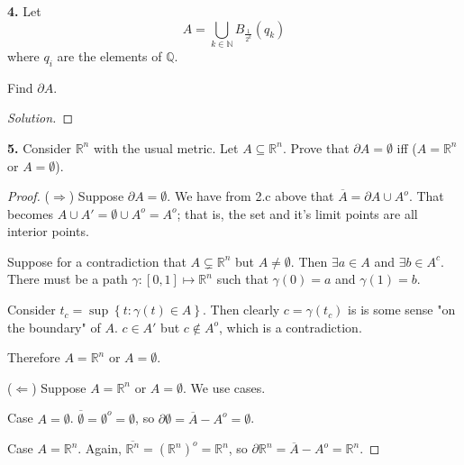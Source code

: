 \documentclass{article}
\newcommand{\R}{\mathbb{R}}
\newcommand{\N}{\mathbb{N}}
\newcommand{\Q}{\mathbb{Q}}
\newcommand{\set}[1]{\left\{ #1 \right\}}
\newcommand{\ol}[1]{\overline{#1}}
\newenvironment{solution}{\begin{proof}[Solution]}{\end{proof}}
\begin{document}
\newpage %

\textbf{4. }
Let
$$A = \bigcup_{k \in \N} B_{\frac{1}{2^k}}(q_k)$$
where $q_i$ are the elements of $\Q$.

Find $\partial A$.

\begin{solution}
    

\end{solution}

\newpage %

\textbf{5. } 
Consider $\R^n$ with the usual metric. Let $A \subseteq \R^n$. Prove that $\partial A = \emptyset$ iff ($A = \R^n$ or $A = \emptyset$).

\begin{proof}
    ($\Longrightarrow$) Suppose $\partial A = \emptyset$. We have from 2.c above that $\ol{A} = \partial A \cup A^o$. That becomes $A \cup A' = \emptyset \cup A^o = A^o$; that is, the set and it's limit points are all interior points. 

    Suppose for a contradiction that $A \subsetneq \R^n$ but $A \ne \emptyset$. Then $\exists a \in A$ and $\exists b \in A^c$. 
    There must be a path $\gamma : [0, 1] \mapsto \R^n$ such that $\gamma(0) = a$ and $\gamma(1) = b$. 

    Consider $t_c = \sup\set{t: \gamma(t) \in A}$. Then clearly $c = \gamma(t_c)$ is is some sense "on the boundary" of $A$. 
    $c \in A'$ but $c \notin A^o$, which is a contradiction.

    Therefore $A = \R^n$ or $A = \emptyset$.

    ($\Longleftarrow$) Suppose $A = \R^n$ or $A = \emptyset$. We use cases.
    
    Case $A = \emptyset$. $\ol{\emptyset} = \emptyset^o = \emptyset$, so $\partial\emptyset = \ol{A} - A^o = \emptyset$.

    Case $A = \R^n$. Again, $\ol{\R^n} = (\R^n)^o = \R^n$, so $\partial\R^n = \ol{A} - A^o = \R^n$.
\end{proof}
\end{document}

